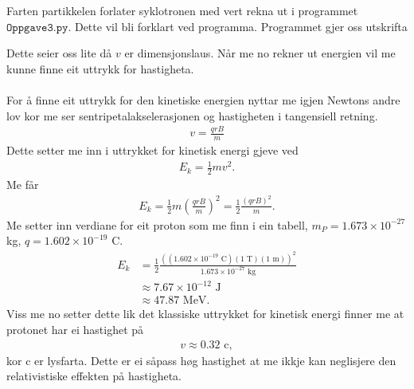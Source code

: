 \documentclass[11pt, a4paper]{article}
\begin{document}
  Farten partikkelen forlater syklotronen med vert rekna ut i programmet $\texttt{Oppgave3.py}$. Dette vil bli forklart ved programma.
  Programmet gjer oss utskrifta
  \begin{center}
    
  \end{center}
  Dette seier oss lite då $v$ er dimensjonslaus. Når me no rekner ut energien vil me kunne finne eit uttrykk for hastigheta. \\ \\
  For å finne eit uttrykk for den kinetiske energien nyttar me igjen Newtons andre lov kor me ser sentripetalakselerasjonen og hastigheten i tangensiell retning.
  \begin{align*}
    v = \frac{qrB}{m}
  \end{align*}
  Dette setter me inn i uttrykket for kinetisk energi gjeve ved
  \begin{align*}
    E_k = \frac{1}{2}mv^2.
  \end{align*}
  Me får
  \begin{align*}
    E_k = \frac{1}{2}m\left( \frac{qrB}{m} \right)^2 = \frac{1}{2}\frac{\left( qrB \right)^2}{m}.
  \end{align*}
  Me setter inn verdiane for eit proton som me finn i ein tabell, $m_P = 1.673\times10^{-27}$ kg, $q = 1.602\times10^{-19}$ C.
  \begin{align*}
    E_k &= \frac{1}{2}\frac{\left( (1.602\times10^{-19}\text{ C})(1 \text{ T})(1\text{ m}) \right)^2}{1.673\times10^{-27}\text{ kg}} \\
    &\approx 7.67\times10^{-12}\text{ J} \\
    &\approx 47.87 \text{ MeV}.
  \end{align*}
  Viss me no setter dette lik det klassiske uttrykket for kinetisk energi finner me at protonet har ei hastighet på 
  \begin{align*}
    v \approx 0.32\text{ c},
  \end{align*}
  kor c er lysfarta. Dette er ei såpass høg hastighet at me ikkje kan neglisjere den relativistiske effekten på hastigheta. \\ \\
\end{document}
